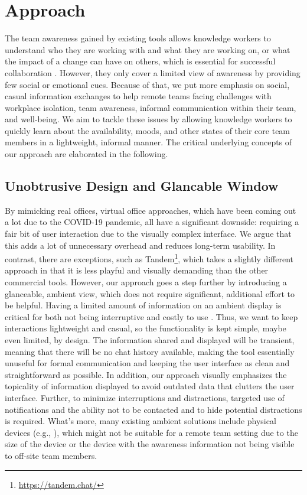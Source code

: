 \chapter{Approach}
\label{chapter:approach}
The team awareness gained by existing tools allows knowledge workers to understand who they are working with and what they are working on, or what the impact of a change can have on others, which is essential for successful collaboration \autocite{dourish1992awareness}. However, they only cover a limited view of awareness by providing few social or emotional cues. Because of that, we put more emphasis on social, casual information exchanges to help remote teams facing challenges with workplace isolation, team awareness, informal communication within their team, and well-being. We aim to tackle these issues by allowing knowledge workers to quickly learn about the availability, moods, and other states of their core team members in a lightweight, informal manner. The critical underlying concepts of our approach are elaborated in the following.

\section{Unobtrusive Design and Glancable Window}
By mimicking real offices, virtual office approaches, which have been coming out a lot due to the COVID-19 pandemic, all have a significant downside: requiring a fair bit of user interaction due to the visually complex interface. We argue that this adds a lot of unnecessary overhead and reduces long-term usability. In contrast, there are exceptions, such as Tandem\footnote{\url{https://tandem.chat/}}, which takes a slightly different approach in that it is less playful and visually demanding than the other commercial tools. However, our approach goes a step further by introducing a glanceable, ambient view, which does not require significant, additional effort to be helpful. Having a limited amount of information on an ambient display is critical for both not being interruptive and costly to use \autocite{dabbish2004controlling}. Thus, we want to keep interactions lightweight and casual, so the functionality is kept simple, maybe even limited, by design. The information shared and displayed will be transient, meaning that there will be no chat history available, making the tool essentially unuseful for formal communication and keeping the user interface as clean and straightforward as possible. In addition, our approach visually emphasizes the topicality of information displayed to avoid outdated data that clutters the user interface. Further, to minimize interruptions and distractions, targeted use of notifications and the ability not to be contacted and to hide potential distractions is required. What's more, many existing ambient solutions include physical devices (e.g., \autocite{ downs2012ambient, alavi2012ambient, rocker2004using}), which might not be suitable for a remote team setting due to the size of the device or the device with the awareness information not being visible to off-site team members.

